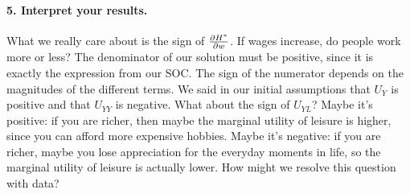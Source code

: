\paragraph{5. Interpret your results.}

What we really care about is the sign of $\frac{\partial H^*}{\partial w}$. If wages increase, do people work more or less? The denominator of our solution must be positive, since it is exactly the expression from our SOC. The sign of the numerator depends on the magnitudes of the different terms. We said in our initial assumptions that $U_Y$ is positive and that $U_{YY}$ is negative. What about the sign of $U_{YL}$? Maybe it's positive: if you are richer, then maybe the marginal utility of leisure is higher, since you can afford more expensive hobbies. Maybe it's negative: if you are richer, maybe you lose appreciation for the everyday moments in life, so the marginal utility of leisure is actually lower. How might we resolve this question with data?

